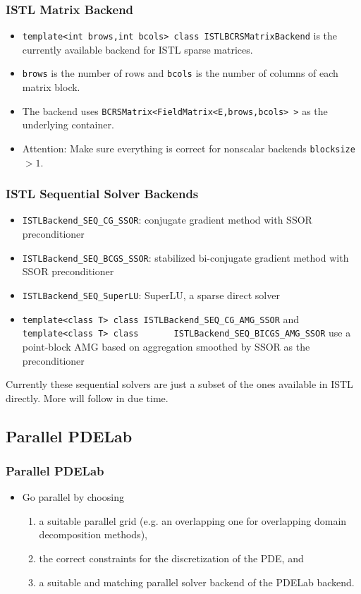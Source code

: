 \begin{frame}
  \frametitle{ISTL Matrix Backend}
  \begin{itemize} 
    \item \lstinline!template<int brows,int bcols> class ISTLBCRSMatrixBackend!
      is the currently available backend for ISTL sparse
      matrices.
    \item \lstinline!brows! is the number of rows and \lstinline!bcols!
      is the number of columns of each matrix block.
  \item The backend uses
    \lstinline!BCRSMatrix<FieldMatrix<E,brows,bcols> >! as the
    underlying container.
  \item Attention: Make sure everything is correct for nonscalar backends
    \lstinline!blocksize!$>1$.
  \end{itemize}
\end{frame}
\begin{frame}[fragile]
  \frametitle{ISTL Sequential Solver Backends}
    \begin{itemize}
    \item \lstinline!ISTLBackend_SEQ_CG_SSOR!:  conjugate gradient method with SSOR preconditioner
    \item \lstinline!ISTLBackend_SEQ_BCGS_SSOR!: stabilized bi-conjugate gradient
      method with SSOR preconditioner
    \item \lstinline!ISTLBackend_SEQ_SuperLU!: SuperLU, a sparse
      direct solver
    \item \lstinline!template<class T> class ISTLBackend_SEQ_CG_AMG_SSOR! and
      \lstinline!template<class T> class
      ISTLBackend_SEQ_BICGS_AMG_SSOR! use a point-block AMG based on
      aggregation smoothed by SSOR as the preconditioner
    \end{itemize}
    Currently these sequential solvers are just a subset of the ones
  available in ISTL directly. More will follow in due time.
\end{frame}

\subsection{Parallel PDELab}
\label{sec:parallelization}

\begin{frame}
  \frametitle<presentation>{Parallel PDELab}
  \begin{itemize}
  \item Go parallel by choosing
    \begin{enumerate}
    \item a suitable parallel grid (e.g. an overlapping one for
      overlapping domain decomposition methods),
    \item the correct constraints for the discretization of
      the PDE, and
    \item a suitable and matching parallel solver backend of the
      PDELab backend.
    \end{enumerate}
  \end{itemize}
\end{frame}


